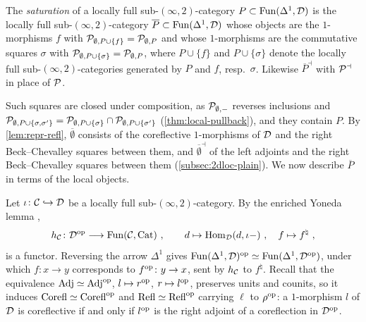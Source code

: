 \begin{defi}
\label{def:saturation}
%
The \emph{saturation} of a locally full sub-$(\infty,2)$-category
$P \subset \operatorname{Fun}(\Delta^{1},\mathcal{D})$
is the locally full sub-$(\infty,2)$-category
$\overline{P} \subset \operatorname{Fun}(\Delta^{1},\mathcal{D})$
whose objects are the $1$-morphisms $f$ with
$\mathcal{P}_{\emptyset,P \cup \{f\}} = \mathcal{P}_{\emptyset,P}$
and whose $1$-morphisms are the commutative squares $\sigma$ with
$\mathcal{P}_{\emptyset,P \cup \{\sigma\}} = \mathcal{P}_{\emptyset,P}$,
where $P \cup \{f\}$ and $P \cup \{\sigma\}$ denote the locally full
sub-$(\infty,2)$-categories generated by $P$ and $f$, resp.\ $\sigma$. Likewise
$\overline{P}^{\dashv}$
with $\mathcal{P}^{\dashv}$ in place of $\mathcal{P}$.
\end{defi}

%
Such squares are closed under composition,
as $\mathcal{P}_{\emptyset,-}$ reverses inclusions and
$\mathcal{P}_{\emptyset,P \cup \{\sigma,\sigma'\}} = \mathcal{P}_{\emptyset,P \cup \{\sigma\}}
\cap \mathcal{P}_{\emptyset,P \cup \{\sigma'\}}$
(\cref{thm:local-pullback}), and they contain $P$. By \cref{lem:repr-refl},
$\overline{\emptyset}$ consists of the coreflective $1$-morphisms of $\mathcal{D}$ and
the right Beck--Chevalley squares between them, and
$\overline{\emptyset}^{\dashv}$
of the left adjoints and the right Beck--Chevalley squares between them
(\cref{subsec:2dloc-plain}). We now describe $\overline{P}$ in terms of the
local objects.

%
Let
$\iota\colon \mathcal{C} \hookrightarrow \mathcal{D}$
be a locally full sub-$(\infty,2)$-category.
By the enriched Yoneda lemma \cite{hinich2020yoneda,heine2023enriched},
\begin{equation*}
h_{\C}\colon \D\opcat \longrightarrow \func(\C,\Cat) \ ,
\qquad d \mapsto \Hom_{\D}(d,\iota-) \ , \quad f \mapsto f^{\natural} \ ,
\end{equation*}
is a functor. Reversing the arrow $\Delta^{1}$ gives
$\operatorname{Fun}(\Delta^{1},\mathcal{D})^{\mathrm{op}} \simeq \operatorname{Fun}(\Delta^{1},\mathcal{D}^{\mathrm{op}})$,
under which $f\colon x \to y$ corresponds to
$f^{\mathrm{op}}\colon y \to x$,
sent by $h_{\mathcal{C}}$ to $f^{\natural}$.
Recall that the equivalence
$\mathrm{Adj} \simeq \mathrm{Adj}^{\mathrm{op}}$,
$l \mapsto r^{\mathrm{op}}$, $r \mapsto l^{\mathrm{op}}$, preserves units and counits,
so it induces
$\mathrm{Corefl} \simeq \mathrm{Corefl}^{\mathrm{op}}$
and
$\mathrm{Refl} \simeq \mathrm{Refl}^{\mathrm{op}}$
carrying $\ell$ to $\rho^{\mathrm{op}}$: a $1$-morphism $l$ of $\mathcal{D}$ is coreflective if
and only if $l^{\mathrm{op}}$ is the right adjoint of a coreflection in $\mathcal{D}^{\mathrm{op}}$.

